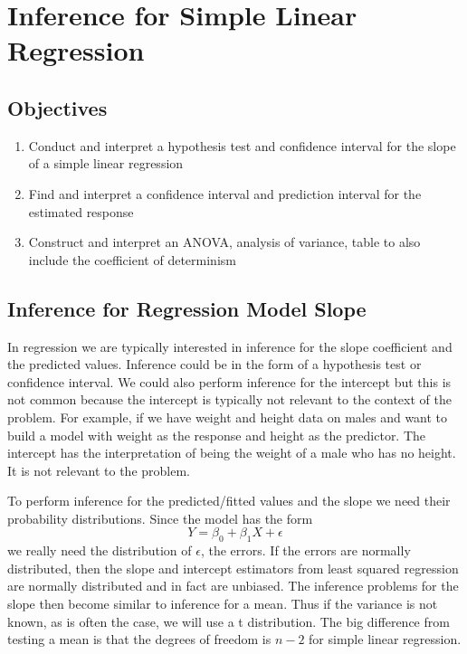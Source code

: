 \documentclass[]{book}
\providecommand{\tightlist}{%
  \setlength{\itemsep}{0pt}\setlength{\parskip}{0pt}}
\theoremstyle{definition}
\theoremstyle{definition}
\theoremstyle{definition}
\theoremstyle{remark}
\begin{document}
\hypertarget{L31}{\section{Inference for Simple Linear
Regression}\label{L31}}

\subsection{Objectives}\label{objectives-28}

\begin{enumerate}
\def\labelenumi{\arabic{enumi}.}
\tightlist
\item
  Conduct and interpret a hypothesis test and confidence interval for
  the slope of a simple linear regression\\
\item
  Find and interpret a confidence interval and prediction interval for
  the estimated response\\
\item
  Construct and interpret an ANOVA, analysis of variance, table to also
  include the coefficient of determinism
\end{enumerate}

\subsection{Inference for Regression Model
Slope}\label{inference-for-regression-model-slope}

In regression we are typically interested in inference for the slope
coefficient and the predicted values. Inference could be in the form of
a hypothesis test or confidence interval. We could also perform
inference for the intercept but this is not common because the intercept
is typically not relevant to the context of the problem. For example, if
we have weight and height data on males and want to build a model with
weight as the response and height as the predictor. The intercept has
the interpretation of being the weight of a male who has no height. It
is not relevant to the problem.

To perform inference for the predicted/fitted values and the slope we
need their probability distributions. Since the model has the form
\[ Y=\beta_{0}+\beta_{1}X+\epsilon\] we really need the distribution of
\(\epsilon\), the errors. If the errors are normally distributed, then
the slope and intercept estimators from least squared regression are
normally distributed and in fact are unbiased. The inference problems
for the slope then become similar to inference for a mean. Thus if the
variance is not known, as is often the case, we will use a t
distribution. The big difference from testing a mean is that the degrees
of freedom is \(n-2\) for simple linear regression.
\end{document}
